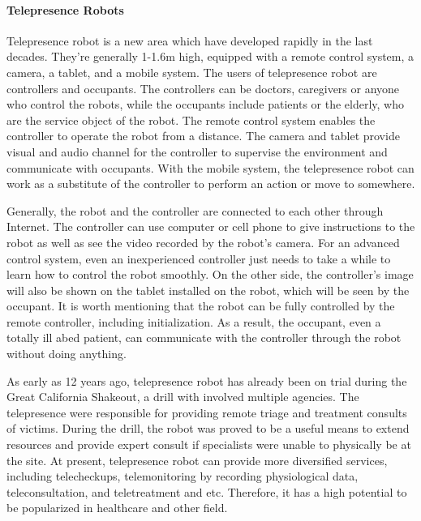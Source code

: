 \documentclass[a4paper]{article}
\begin{document}
\paragraph{Telepresence Robots}
    Telepresence robot is a new area which have developed rapidly in the last decades. They're generally 1-1.6m high, equipped with a remote control system, a camera, a tablet, and a mobile system. The users of telepresence robot are controllers and occupants. The controllers can be doctors, caregivers or anyone who control the robots, while the occupants include patients or the elderly, who are the service object of the robot. The remote control system enables the controller to operate the robot from a distance. The camera and tablet provide visual and audio channel for the controller to supervise the environment and communicate with occupants. With the mobile system, the telepresence robot can work as a substitute of the controller to perform an action or move to somewhere. 
\par 
    Generally, the robot and the controller are connected to each other through Internet. The controller can use computer or cell phone to give instructions to the robot as well as see the video recorded by the robot's camera. For an advanced control system, even an inexperienced controller just needs to take a while to learn how to control the robot smoothly\cite{4}. On the other side, the controller's image will also be shown on the tablet installed on the robot, which will be seen by the occupant. It is worth mentioning that the robot can be fully controlled by the remote controller, including initialization. As a result, the occupant, even a totally ill abed patient, can communicate with the controller through the robot without doing anything.  
\par 
    As early as 12 years ago, telepresence robot has already been on trial during the Great California Shakeout, a drill with involved multiple agencies. The telepresence were responsible for providing remote triage and treatment consults of victims. During the drill, the robot was proved to be a useful means to extend resources and provide expert consult if specialists were unable to physically be at the site\cite{5}. At present, telepresence robot can provide more diversified services, including telecheckups, telemonitoring by recording physiological data, teleconsultation, and teletreatment and etc\cite{6}. Therefore, it has a high potential to be popularized in healthcare and other field.
\end{document}
